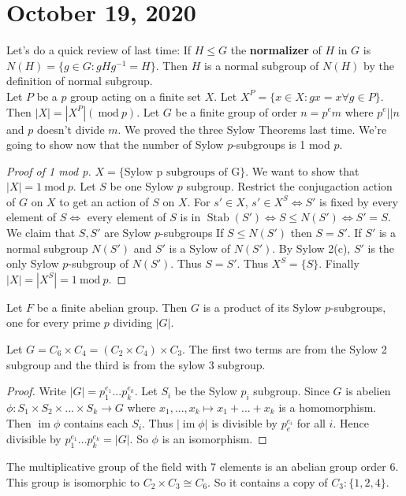\documentclass{article}
\newcommand{\vocab}[1]{\textbf{\color{blue!90}\boldmath #1}}
\renewcommand{\mod}[1]{\ \text{mod}\ #1}
\newcommand{\ra}[1][]{\xrightarrow{#1}}
\DeclareMathOperator{\im}{im}
\DeclareMathOperator{\Stab}{Stab}
\begin{document}
\section{October 19, 2020}
Let's do a quick review of last time:
If $H\leq G$ the \vocab{normalizer} of $H$ in $G$ is $N(H)=\{g\in G:gHg^{-1}=H\}$. Then $H$ is a normal subgroup of $N(H)$ by the definition of normal subgroup.\\
Let $P$ be a $p$ group acting on a finite set $X$. Let $X^P=\{x\in X:gx=x\forall g\in P\}$. Then $|X|=|X^P|(\mod{p})$. Let $G$ be a finite group of order $n=p^em$ where $p^e||n$ and $p$ doesn't divide $m$. We proved the three Sylow Theorems last time.
We're going to show now that the number of Sylow $p$-subgroups is 1 mod $p$.
\begin{proof}[Proof of 1 mod p]
$X=\{\textrm{Sylow p subgroups of G}\}$. We want to show that $|X|=1\mod{p}$. Let $S$ be one Sylow $p$ subgroup. Restrict the conjugaction action of $G$ on $X$ to get an action of $S$ on $X$. For $s'\in X$, $s'\in X^S\iff S'$ is fixed by every element of $S\iff$ every element of $S$ is in $\Stab(S')\iff S\leq N(S')\iff S'=S$. We claim that $S,S'$ are Sylow $p$-subgroups If $S\leq N(S')$ then $S=S'$. If $S'$ is a normal subgroup $N(S')$ and $S'$ is a Sylow of $N(S')$. By Sylow 2(c), $S'$ is the only Sylow $p$-subgroup of $N(S')$. Thus $S=S'$. Thus $X^S=\{S\}$. Finally $|X|=|X^S|=1\mod{p}$.
\end{proof}
\begin{theorem}
Let $F$ be a finite abelian group. Then $G$ is a product of its Sylow $p$-subgroups, one for every prime $p$ dividing $|G|$.
\end{theorem}
\begin{example}
Let $G=C_6\times C_4=(C_2\times C_4)\times C_3$. The first two terms are from the Sylow 2 subgroup and the third is from the sylow 3 subgroup.
\end{example}
\begin{proof}
Write $|G|=p_1^{e_1}...p_k^{e_k}$. Let $S_i$ be the Sylow $p_i$ subgroup. Since $G$ is abelien $\phi:S_1\times S_2\times...\times S_k\ra G$ where $x_1,...,x_k\mapsto x_1+...+x_k$ is a homomorphism. Then $\im\phi$ contains each $S_i$. Thus $|\im\phi|$ is divisible by $p_e^{e_i}$ for all $i$. Hence divisible by $p_1^{e_1}...p_k^{e_k}=|G|$. So $\phi$ is an isomorphism.
\end{proof}
\begin{example}
The multiplicative group of the field with 7 elements is an abelian group order 6. This group is isomorphic to $C_2\times C_3\cong C_6$. So it contains a copy of $C_3: \{1,2,4\}$.
\end{example}
\end{document}
